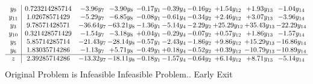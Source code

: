 \documentclass[9pt]{article}
\begin{document}
\[\begin{array}{c| c c@{\hskip 2pt} c@{\hskip 2pt} c@{\hskip 2pt} c@{\hskip 2pt} c@{\hskip 2pt} c@{\hskip 2pt} c@{\hskip 2pt} c@{\hskip 2pt} }
 y_{9}   &  0.723214285714 & -3.96 y_{7} & -3.90 y_{8} & -0.17 y_{1} & -0.39 y_{4} & -0.16 y_{2} & +  1.54 y_{12} & +  1.93 y_{13} & -1.04 y_{14}\\
 y_{11}   &  1.02678571429 & -5.29 y_{7} & -6.85 y_{8} & -0.08 y_{1} & -0.61 y_{4} & -0.34 y_{2} & +  2.46 y_{12} & +  3.07 y_{13} & -3.96 y_{14}\\
 y_{3}   &  9.78571428571 & -36.64 y_{7} & -63.21 y_{8} & -1.36 y_{1} & -5.14 y_{4} & -2.29 y_{2} & + 25.29 y_{12} & + 35.43 y_{13} & -22.29 y_{14}\\
 y_{10}   &  0.321428571429 & -1.54 y_{7} & -3.18 y_{8} & +  0.04 y_{1} & -0.29 y_{4} & -0.07 y_{2} & +  0.57 y_{12} & +  1.86 y_{13} & -1.57 y_{14}\\
 y_{5}   &  5.85714285714 & -21.43 y_{7} & -28.14 y_{8} & -0.57 y_{1} & -2.43 y_{4} & -1.86 y_{2} & +  9.86 y_{12} & + 15.29 y_{13} & -16.86 y_{14}\\
 y_{6}   &  1.83035714286 & -1.13 y_{7} & +  5.71 y_{8} & -0.49 y_{1} & +  0.18 y_{4} & -0.52 y_{2} & +  0.39 y_{12} & -10.79 y_{13} & -10.89 y_{14}\\
\hline
z    &  2.39285714286 & -13.32 y_{7} & -18.11 y_{8} & -0.18 y_{1} & -1.57 y_{4} & -0.64 y_{2} & +  6.14 y_{12} & +  8.71 y_{13} & -5.14 y_{14}\\
\end{array}\]
Original Problem is Infeasible
Infeasible Problem.. Early Exit
\end{document}
